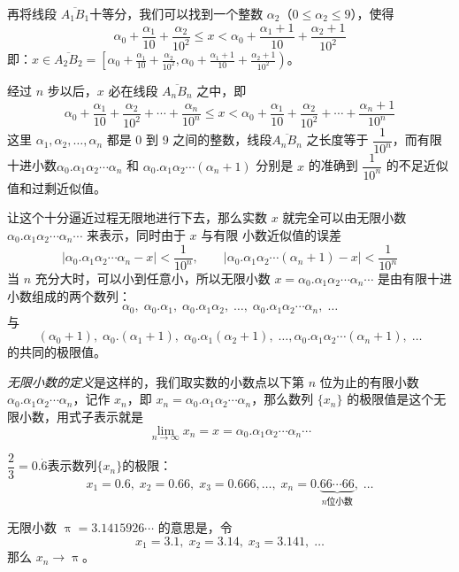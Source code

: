 \medskip
再将线段 $\overline{A_1B_1}$十等分，我们可以找到一个整数 $\alpha_2$（$0\leqslant \alpha_2\leqslant 9$），使得
\[\alpha_0+\frac{\alpha_1}{10}+\frac{\alpha_2}{10^2}\le x<\alpha_0+\frac{\alpha_1+1}{10}+\frac{\alpha_2+1}{10^2}\]
即：$\displaystyle x\in\overline{A_2B_2}=\left[\alpha_0+\frac{\alpha_1}{10}+\frac{\alpha_2}{10^2}, \alpha_0+\frac{\alpha_1+1}{10}+\frac{\alpha_2+1}{10^2}\right)$。

经过 $n$ 步以后，$x$ 必在线段 $\overline{A_nB_n}$ 之中，即
\[\alpha_0+\frac{\alpha_1}{10}+\frac{\alpha_2}{10^2}+\cdots+\frac{\alpha_n}{10^n}\le x<\alpha_0+\frac{\alpha_1}{10}+\frac{\alpha_2}{10^2}+\cdots+\frac{\alpha_n+1}{10^n}\]
这里 $\alpha_1,\alpha_2,\ldots,\alpha_n$ 都是 0 到 9 之间的整数，线段$\overline{A_nB_n}$ 之长度等于 $\dfrac{1}{10^n}$，而有限十进小数$\alpha_0.\alpha_1\alpha_2\cdots\alpha_n$ 和 $\alpha_0.\alpha_1\alpha_2\cdots(\alpha_n+1)$ 分别是 $x$ 的准确到 $\dfrac{1}{10^n}$ 的不足近似值和过剩近似值。

让这个十分逼近过程无限地进行下去，那么实数 $x$ 就完全可以由无限小数$\alpha_0.\alpha_1\alpha_2\cdots\alpha_n\cdots$ 来表示，同时由于 $x$ 与有限
小数近似值的误差
\[|\alpha_0.\alpha_1\alpha_2\cdots\alpha_n-x|<\frac{1}{10^n},\qquad  |\alpha_0.\alpha_1\alpha_2\cdots(\alpha_n+1)-x|<\frac{1}{10^n}\]
当 $n$ 充分大时，可以小到任意小，所以无限小数 $x=\alpha_0.\alpha_1\alpha_2\cdots\alpha_n\cdots$ 是由有限十进小数组成的两个数列：
\[\alpha_0,\; \alpha_0.\alpha_1,\;\alpha_0.\alpha_1\alpha_2,\;\ldots,\;  \alpha_0.\alpha_1\alpha_2\cdots\alpha_n,\;\ldots\]
与
\[(\alpha_0+1),\; \alpha_0.(\alpha_1+1),\;\alpha_0.\alpha_1(\alpha_2+1),\;\ldots, \alpha_0.\alpha_1\alpha_2\cdots(\alpha_n+1),\;\ldots\]
的共同的极限值。

\emph{无限小数的定义}是这样的，我们取实数的小数点以下第 $n$ 位为止的有限小数 $\alpha_0.\alpha_1\alpha_2\cdots\alpha_n$，记作 $x_n$，即 $x_n=\alpha_0.\alpha_1\alpha_2\cdots\alpha_n$，那么数列 $\{x_n\}$ 的极限值是这个无限小数，用式子表示就是
\[\lim_{n\to\infty}x_n=x=\alpha_0.\alpha_1\alpha_2\cdots\alpha_n\cdots\]


\begin{example}
$\dfrac{2}{3}=0.\dot{6}$表示数列$\{x_n\}$的极限：
\[x_1=0.6,\; x_2=0.66,\; x_3=0.666,\ldots,\; x_n=0.\underbrace{66\cdots 66}_{\text{$n$位小数}},\; \ldots\]
\end{example}

\begin{example}
  无限小数 $\uppi=3.1415926\cdots$ 的意思是，令
  \[ x_1=3.1,\; x_2=3.14,\; x_3=3.141,\; \ldots\]
  那么 $x_n\to \uppi$。
\end{example}

